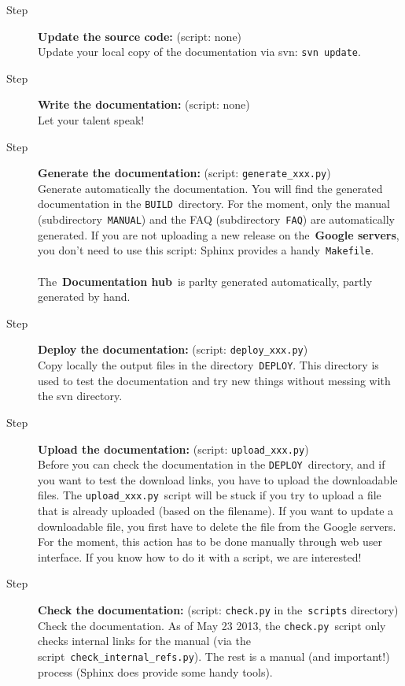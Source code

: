 \documentclass[a4paper,10pt]{article}
\newcommand{\code}[1]{\texttt{#1}}
\newcommand{\gservers}{{\bf Google servers}}
\newcommand{\dhub}{{\bf Documentation hub}}
\begin{document}
\begin{description}
 \item[Step ] {\bf Update the source code:} (script: none)\\Update your local copy of the documentation via svn: \code{svn update}.
 \item[Step ] {\bf Write the documentation:} (script: none)\\Let your talent speak!

 \item[Step ] {\bf Generate the documentation:} (script: \code{generate\_xxx.py})\\Generate automatically the documentation. You will find the generated documentation
in the \code{BUILD}~directory. For the moment, only the manual (subdirectory~\code{MANUAL}) and the FAQ (subdirectory~\code{FAQ}) are automatically generated. If you are not uploading a new release on the~\gservers, you 
don't need to use this script: Sphinx provides a handy~\code{Makefile}.\\~\\
The~\dhub\ is parlty generated automatically, partly generated by hand.

 \item[Step ] {\bf Deploy the documentation:} (script: \code{deploy\_xxx.py})\\Copy locally the output files in the directory~\code{DEPLOY}. This directory is used to test
the documentation and try new things without messing with the svn directory.

\item[Step ] {\bf Upload the documentation:} (script: \code{upload\_xxx.py})\\Before you can check the documentation in the \code{DEPLOY}~directory, and if you want to test the download links, you have to upload the downloadable files. The \code{upload\_xxx.py}~script will be stuck if you try to upload a file that is already uploaded (based on the filename). If you want to update a downloadable file, you first have to delete the file from the Google servers. For the moment, this action has to be done manually through web user interface. If you know how to do it with a script, we are interested!

 \item[Step ] {\bf Check the documentation:} (script: \code{check.py} in the~\code{scripts} directory)\\Check the documentation. As of May 23 2013, the \code{check.py}~script only checks internal links for the manual (via the script~\code{check\_internal\_refs.py}). The rest is a manual (and important!) process 
(Sphinx does provide some handy tools).


\end{description}
\end{document}

